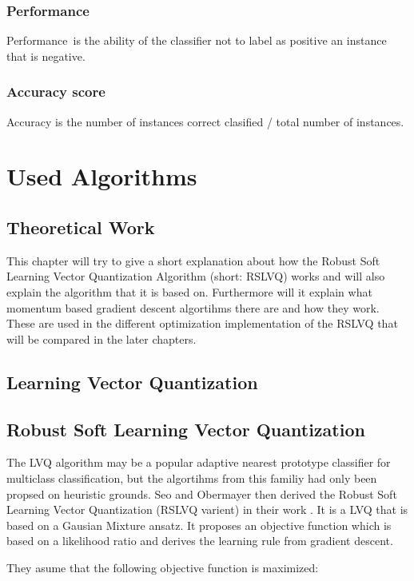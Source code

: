 \documentclass[12pt,oneside,a4paper,parskip]{scrbook}
\begin{document}
\subsection{Performance}
Performance is the ability of the classifier not to label as positive an instance that is negative.

\subsection{Accuracy score}
Accuracy is the number of instances correct clasified / total number of instances.

\chapter{Used Algorithms}

\section{Theoretical Work}

This chapter will try to give a short explanation about how the Robust Soft Learning Vector Quantization Algorithm 
(short: RSLVQ) works and will also explain the algorithm that it is based on. 
Furthermore will it explain what momentum based gradient descent algortihms there are and how they work.
These are used in the different optimization implementation of the RSLVQ that will be compared in the later chapters. 

\section{Learning Vector Quantization}

\section{Robust Soft Learning Vector Quantization}
The LVQ algorithm may be a popular adaptive nearest prototype classifier for multiclass classification, 
but the algortihms from this familiy had only been propsed on heuristic grounds. Seo and Obermayer then derived the 
Robust Soft Learning Vector Quantization (RSLVQ varient) in their work \cite{RSLVQOrig}. It is a LVQ that is based on 
a Gausian Mixture ansatz. It proposes an objective function which is based on a likelihood ratio and derives the
learning rule from gradient descent.

They asume that the following objective function is maximized:
\end{document}
